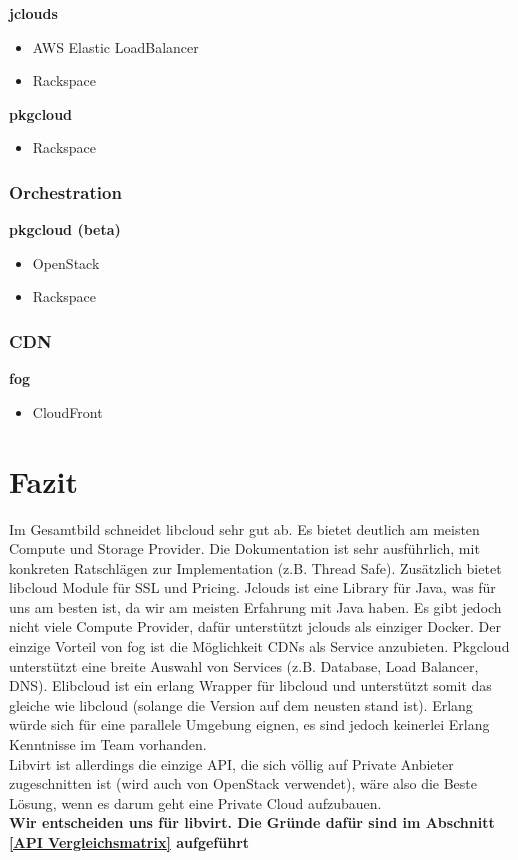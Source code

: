 \textbf{jclouds}
\begin{multicols}{2}
\begin{itemize}
\item AWS Elastic LoadBalancer
\item Rackspace
\end{itemize}
\end{multicols}

\textbf{pkgcloud}
\begin{itemize}
\item Rackspace
\end{itemize}

\subsubsection{Orchestration}
\textbf{pkgcloud (beta)}
\begin{multicols}{2}
\begin{itemize}
\item OpenStack
\item Rackspace
\end{itemize}
\end{multicols}

\subsubsection{CDN}
\textbf{fog}
\begin{itemize}
\item CloudFront
\end{itemize}

\newpage

\section{Fazit}

Im Gesamtbild schneidet libcloud sehr gut ab. Es bietet deutlich am meisten Compute und 
Storage Provider. Die Dokumentation ist sehr ausführlich, mit konkreten Ratschlägen zur 
Implementation (z.B. Thread Safe). Zusätzlich bietet libcloud Module für SSL und Pricing.
Jclouds ist eine Library für Java, was für uns am besten ist, da wir am meisten Erfahrung mit 
Java haben. Es gibt jedoch nicht viele Compute Provider, dafür unterstützt jclouds als einziger Docker.
Der einzige Vorteil von fog ist die Möglichkeit CDNs als Service anzubieten.
Pkgcloud unterstützt eine breite Auswahl von Services (z.B. Database, Load Balancer, DNS).
Elibcloud ist ein erlang Wrapper für libcloud und unterstützt somit das gleiche wie libcloud 
(solange die Version auf dem neusten stand ist). Erlang würde sich für eine parallele Umgebung eignen, 
es sind jedoch keinerlei Erlang Kenntnisse im Team vorhanden.\\
Libvirt ist allerdings die einzige API, die sich völlig auf Private Anbieter 
zugeschnitten ist (wird auch von OpenStack verwendet), wäre also die Beste 
Lösung, wenn es darum geht eine Private Cloud aufzubauen.
\\
\textbf{Wir entscheiden uns für libvirt. Die Gründe dafür sind im Abschnitt \ref{API Vergleichsmatrix} aufgeführt}


